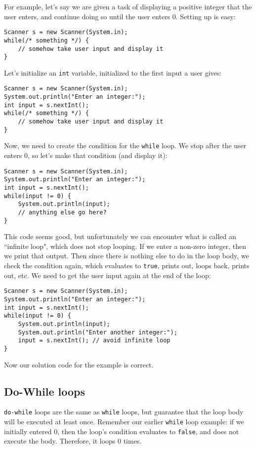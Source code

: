 \par For example, let's say we are given a task of displaying a positive integer that the user enters, and continue doing so until the user enters 0. Setting up is easy:
\begin{lstlisting}
Scanner s = new Scanner(System.in);
while(/* something */) {
	// somehow take user input and display it
}
\end{lstlisting}
Let's initialize an \verb|int| variable, initialized to the first input a user gives:
\begin{lstlisting}
Scanner s = new Scanner(System.in);
System.out.println("Enter an integer:");
int input = s.nextInt();
while(/* something */) {
	// somehow take user input and display it
}
\end{lstlisting}
Now, we need to create the condition for the \verb|while| loop. We stop after the user enters 0, so let's make that condition (and display it):
\begin{lstlisting}
Scanner s = new Scanner(System.in);
System.out.println("Enter an integer:");
int input = s.nextInt();
while(input != 0) {
	System.out.println(input);
	// anything else go here?
}
\end{lstlisting}
This code seems good, but unfortunately we can encounter what is called an ``infinite loop", which does not stop looping. If we enter a non-zero integer, then we print that output. Then since there is nothing else to do in the loop body, we check the condition again, which evaluates to \verb|true|, prints out, loops back, prints out, etc. We need to get the user input again at the end of the loop:
\begin{lstlisting}
Scanner s = new Scanner(System.in);
System.out.println("Enter an integer:");
int input = s.nextInt();
while(input != 0) {
	System.out.println(input);
	System.out.println("Enter another integer:");
	input = s.nextInt(); // avoid infinite loop
}
\end{lstlisting}
Now our solution code for the example is correct.

\subsection{Do-While loops}
\verb|do-while| loops are the same as \verb|while| loops, but guarantee that the loop body will be executed at least once. Remember our earlier \verb|while| loop example: if we initially entered 0, then the loop's condition evaluates to \verb|false|, and does not execute the body. Therefore, it loops 0 times. 

